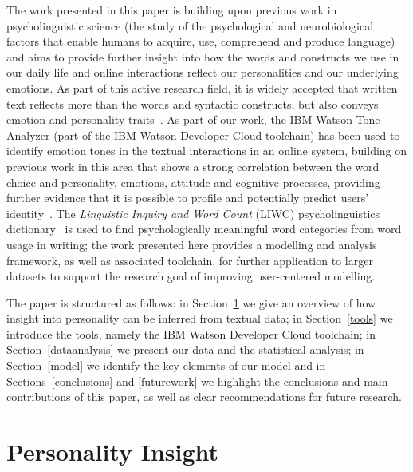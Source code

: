 \documentclass[graybox]{svmult}
\begin{document}

The work presented in this paper is building upon previous work in
psycholinguistic science (the study of the psychological and
neurobiological factors that enable humans to acquire, use, comprehend
and produce language) and aims to provide further insight into how the
words and constructs we use in our daily life and online interactions
reflect our personalities and our underlying emotions. As part of this
active research field, it is widely accepted that written text
reflects more than the words and syntactic constructs, but also
conveys emotion and personality
traits~\citep{pennebaker+king:1999}. As part of our work, the IBM
Watson Tone Analyzer (part of the IBM Watson Developer Cloud
toolchain) has been used to identify emotion tones in the textual
interactions in an online system, building on previous work in this
area that shows a strong correlation between the word choice and
personality, emotions, attitude and cognitive processes, providing
further evidence that it is possible to profile and potentially
predict users’ identity~\citep{fast+funder:2008}. The
{\emph{Linguistic Inquiry and Word Count}} (LIWC) psycholinguistics
dictionary~\citep{pennebaker-et-al:2001,tausczik+pennebaker:2010} is
used to find psychologically meaningful word categories from word
usage in writing; the work presented here provides a modelling and
analysis framework, as well as associated toolchain, for further
application to larger datasets to support the research goal of
improving user-centered modelling.

The paper is structured as follows: in Section~\ref{personality} we
give an overview of how insight into personality can be inferred from
textual data; in Section~\ref{tools} we introduce the tools, namely
the IBM Watson Developer Cloud toolchain; in
Section~\ref{dataanalysis} we present our data and the statistical
analysis; in Section~\ref{model} we identify the key elements of our
model and in Sections~\ref{conclusions} and \ref{futurework} we
highlight the conclusions and main contributions of this paper, as
well as clear recommendations for future research.

\section{Personality Insight}\label{personality}
\end{document}
